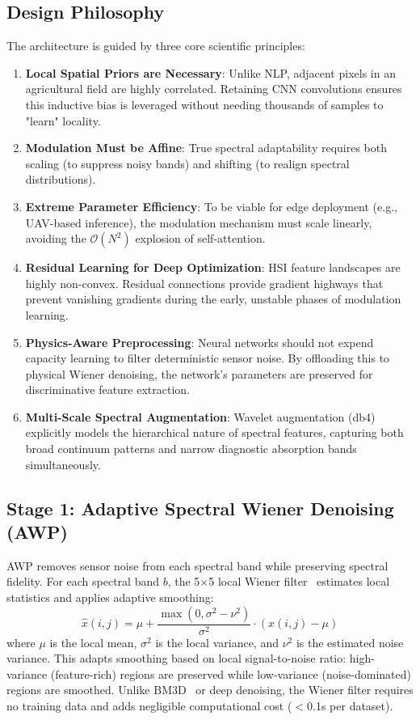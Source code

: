 \documentclass[conference]{IEEEtran}
\begin{document}
{\subsection{Design Philosophy}
The architecture is guided by three core scientific principles:
\begin{enumerate}
    \item \textbf{Local Spatial Priors are Necessary}: Unlike NLP, adjacent pixels in an agricultural field are highly correlated. Retaining CNN convolutions ensures this inductive bias is leveraged without needing thousands of samples to "learn" locality.
    \item \textbf{Modulation Must be Affine}: True spectral adaptability requires both scaling (to suppress noisy bands) and shifting (to realign spectral distributions).
    \item \textbf{Extreme Parameter Efficiency}: To be viable for edge deployment (e.g., UAV-based inference), the modulation mechanism must scale linearly, avoiding the $\mathcal{O}(N^2)$ explosion of self-attention.
    \item \textbf{Residual Learning for Deep Optimization}: HSI feature landscapes are highly non-convex. Residual connections provide gradient highways that prevent vanishing gradients during the early, unstable phases of modulation learning.
    \item \textbf{Physics-Aware Preprocessing}: Neural networks should not expend capacity learning to filter deterministic sensor noise. By offloading this to physical Wiener denoising, the network's parameters are preserved for discriminative feature extraction.
    \item \textbf{Multi-Scale Spectral Augmentation}: Wavelet augmentation (db4) explicitly models the hierarchical nature of spectral features, capturing both broad continuum patterns and narrow diagnostic absorption bands simultaneously.
\end{enumerate}
\subsection{Stage 1: Adaptive Spectral Wiener Denoising (AWP)}

AWP removes sensor noise from each spectral band while preserving spectral fidelity. For each spectral band $b$, the 5$\times$5 local Wiener filter~\cite{wiener1949extrapolation} estimates local statistics and applies adaptive smoothing:
\begin{equation}
\hat{x}(i,j) = \mu + \frac{\max(0, \sigma^2 - \nu^2)}{\sigma^2} \cdot (x(i,j) - \mu)
\end{equation}
where $\mu$ is the local mean, $\sigma^2$ is the local variance, and $\nu^2$ is the estimated noise variance. This adapts smoothing based on local signal-to-noise ratio: high-variance (feature-rich) regions are preserved while low-variance (noise-dominated) regions are smoothed. Unlike BM3D~\cite{dabov2007image} or deep denoising, the Wiener filter requires no training data and adds negligible computational cost ($<$0.1s per dataset).

}
\end{document}
